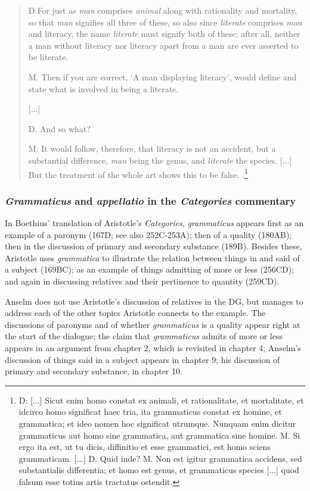 \documentclass[]{article}
\begin{document}
\begin{quote}
D.For just as \textit{man} comprises \textit{animal} along with rationality and mortality, so that \textit{man} signifies all three of these, so also since \textit{literate} comprises \textit{man} and literacy, the name \textit{literate} must signify both of these; after all, neither a man without literacy nor literacy apart from a man are ever asserted to be literate.

M. Then if you are correct, `A man displaying literacy', would define and state what is involved in being a literate. 

[...]

D. And so what?

M. It would follow, therefore, that literacy is not an accident, but a substantial difference, \textit{man} being the genus, and \textit{literate} the species. [...] But the treatment of the whole art shows this to be false. \cite[pp. 65-66, alt]{Henry1974}.\footnote{D: [...] Sicut enim homo constat ex animali, et rationalitate, et mortalitate, et idcirco homo significat haec tria, ita grammaticus constat ex homine, et grammatica; et ideo nomen hoc significat utrumque. Nunquam enim dicitur grammaticus aut homo sine grammatica, aut grammatica sine homine. M. Si ergo ita est, ut tu dicis, diffinitio et esse grammatici, est homo sciens grammaticam. [...] D. Quid inde? M. Non est igitur grammatica accidens, sed substantialis differentia; et homo est genus, et grammaticus species [...] quod falsum esse totius artis tractatus ostendit.}
\end{quote}
\subsubsection{\textit{Grammaticus} and \textit{appellatio} in the \textit{Categories} commentary}
In Boethius' translation of Aristotle's \textit{Categories}, \textit{grammaticus} appears first as an example of a paronym (167D; see also 252C-253A); then of a quality (180AB); then in the discussion of primary and secondary substance (189B). Besides these, Aristotle uses \textit{grammatica} to illustrate the relation between things in and said of a subject (169BC); as an example of things admitting of more or less (256CD); and again in discussing relatives and their pertinence to quantity (259CD).

Anselm does not use Aristotle's discussion of relatives in the DG, but manages to address each of the other topics Aristotle connects to the example. The discussions of paronyms and of whether \textit{grammaticus} is a quality appear right at the start of the dialogue; the claim that \textit{grammaticus} admits of more or less appears in an argument from chapter 2, which is revisited in chapter 4; Anselm's discussion of things said in a subject appears in chapter 9; his discussion of primary and secondary substance, in chapter 10. 
\end{document}

